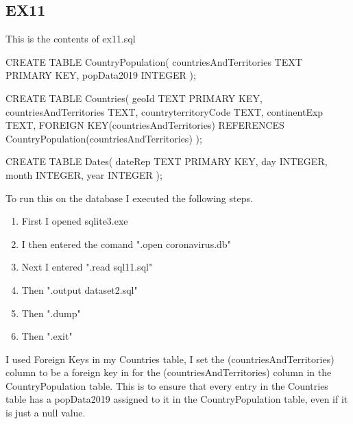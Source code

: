 \documentclass{report}
\begin{document}
	\subsection{EX11}		
	
	This is the contents of ex11.sql\newline
	
	CREATE TABLE CountryPopulation(\newline
	countriesAndTerritories TEXT PRIMARY KEY,\newline
	popData2019 INTEGER\newline
	);\newline
	
	
	CREATE TABLE Countries(\newline
	geoId TEXT PRIMARY KEY,\newline
	countriesAndTerritories TEXT,\newline
	countryterritoryCode TEXT,\newline
	continentExp TEXT,\newline
	FOREIGN KEY(countriesAndTerritories) REFERENCES CountryPopulation(countriesAndTerritories)\newline
	);\newline
	
	
	CREATE TABLE Dates(\newline
	dateRep TEXT PRIMARY KEY,\newline
	day INTEGER,\newline
	month INTEGER,\newline
	year INTEGER\newline
	);\newline
	
	To run this on the database I executed the following steps.\newline
	
	\begin{enumerate}
		\item First I opened sqlite3.exe
		\item I then entered the comand ".open coronavirus.db"
		\item Next I entered ".read sql11.sql"
		\item Then ".output dataset2.sql"
		\item Then ".dump"
		\item Then ".exit"
	\end{enumerate}
	
	I used Foreign Keys in my Countries table, I set the (countriesAndTerritories) column to be a foreign key in for the (countriesAndTerritories) column in the CountryPopulation table. This is to ensure that every entry in the Countries table has a popData2019 assigned to it in the CountryPopulation table, even if it is just a null value.\newline
	
\end{document}
